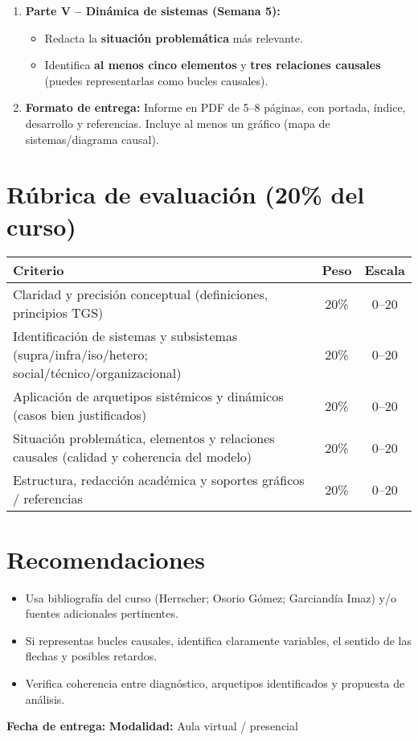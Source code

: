 \documentclass[11pt,a4paper]{article}
\begin{document}
\begin{enumerate}
  \item \textbf{Parte V -- Dinámica de sistemas (Semana 5):}
  \begin{itemize}
    \item Redacta la \textbf{situación problemática} más relevante.
    \item Identifica \textbf{al menos cinco elementos} y \textbf{tres relaciones causales} (puedes representarlas como bucles causales).
  \end{itemize}
  \item \textbf{Formato de entrega:} Informe en PDF de 5--8 páginas, con portada, índice, desarrollo y referencias. Incluye al menos un gráfico (mapa de sistemas/diagrama causal).
\end{enumerate}

\section*{Rúbrica de evaluación (20\% del curso)}
\begin{center}
\begin{tabular}{p{8cm}cc}
\toprule
\textbf{Criterio} & \textbf{Peso} & \textbf{Escala}\\
\midrule
Claridad y precisión conceptual (definiciones, principios TGS) & 20\% & 0--20 \\
Identificación de sistemas y subsistemas (supra/infra/iso/hetero; social/técnico/organizacional) & 20\% & 0--20 \\
Aplicación de arquetipos sistémicos y dinámicos (casos bien justificados) & 20\% & 0--20 \\
Situación problemática, elementos y relaciones causales (calidad y coherencia del modelo) & 20\% & 0--20 \\
Estructura, redacción académica y soportes gráficos / referencias & 20\% & 0--20 \\
\bottomrule
\end{tabular}
\end{center}

\section*{Recomendaciones}
\begin{itemize}
  \item Usa bibliografía del curso (Herrscher; Osorio Gómez; Garciandía Imaz) y/o fuentes adicionales pertinentes.
  \item Si representas bucles causales, identifica claramente variables, el sentido de las flechas y posibles retardos.
  \item Verifica coherencia entre diagnóstico, arquetipos identificados y propuesta de análisis.
\end{itemize}

\vfill
\noindent \textbf{Fecha de entrega:} \underline{\hspace{3cm}} \hfill \textbf{Modalidad:} Aula virtual / presencial\\
\end{document}
